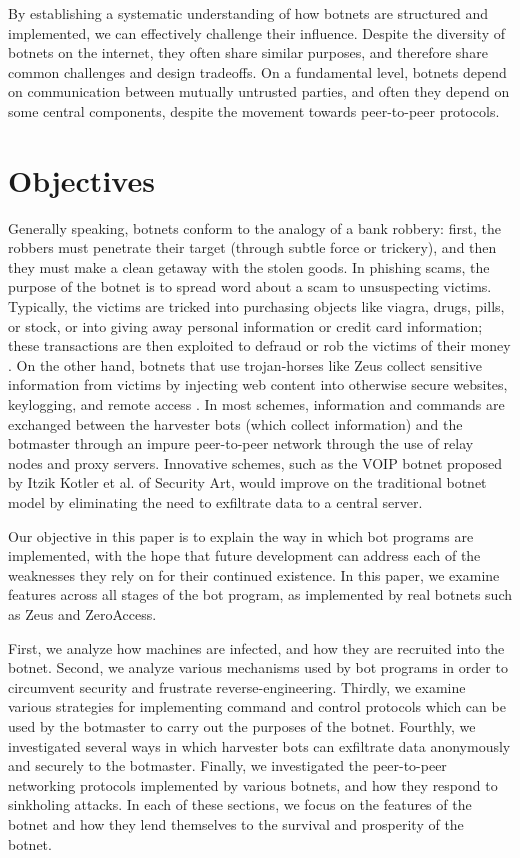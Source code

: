 \documentclass{acm_proc_article-sp}
\begin{document}
By establishing a systematic understanding of how botnets are structured and implemented, we can effectively challenge their influence. Despite the diversity of botnets on the internet, they often share similar purposes, and therefore share common challenges and design tradeoffs.  On a fundamental level, botnets depend on communication between mutually untrusted parties\cite{stone:p2p}, and often they depend on some central components, despite the movement towards peer-to-peer protocols.


\section{Objectives}

Generally speaking, botnets conform to the analogy of a bank robbery: first, the robbers must penetrate their target (through subtle force or trickery), and then they must make a clean getaway with the stolen goods. In phishing scams, the purpose of the botnet is to spread word about a scam to unsuspecting victims. Typically, the victims are tricked into purchasing objects like viagra, drugs, pills, or stock, or into giving away personal information or credit card information; these transactions are then exploited to defraud or rob the victims of their money
\cite{defcon:javascript}
\cite{defcon:spam}
\cite{wikipedia:phishing}.  On the other hand, botnets that use trojan-horses like Zeus collect sensitive information from victims by injecting web content into otherwise secure websites, keylogging, and remote access\cite{defcon:javascript}
\cite{blackhat:zeus}
\cite{defcon:spam}
\cite{wikipedia:trojan}. In most schemes, information and commands are exchanged between the harvester bots (which collect information) and the botmaster through an impure peer-to-peer network through the use of relay nodes and proxy servers. Innovative schemes, such as the VOIP botnet proposed by Itzik Kotler et al. of Security Art, would improve on the traditional botnet model by eliminating the need to exfiltrate data to a central server\cite{defcon:voip}.

Our objective in this paper is to explain the way in which bot programs are implemented, with the hope that future development can address each of the weaknesses they rely on for their continued existence.  In this paper, we examine features across all stages of the bot program, as implemented by real botnets such as Zeus and ZeroAccess.

First, we analyze how machines are infected, and how they are recruited into the botnet. Second, we analyze various mechanisms used by bot programs in order to circumvent security  and frustrate reverse-engineering. Thirdly, we examine various strategies for implementing command and control protocols which can be used by the botmaster to carry out the purposes of the botnet. Fourthly, we investigated several ways in which harvester bots can exfiltrate data anonymously and securely to the botmaster.  Finally, we investigated the peer-to-peer networking protocols implemented by various botnets, and how they respond to sinkholing attacks.  In each of these sections, we focus on the features of the botnet and how they lend themselves to the survival and prosperity of the botnet.
\end{document}
